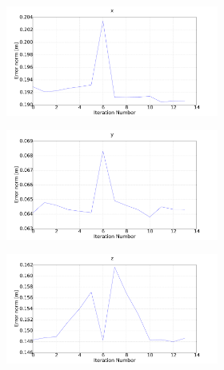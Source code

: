 \begin{figure}
  \centering
  \begin{subfigure}{0.48\textwidth}
    \begin{subfigure}{\textwidth}
      \includegraphics[clip, trim = 60 0 140 20, width=\textwidth]{figures/chapter3/err_x}
    \end{subfigure}
    \begin{subfigure}{\textwidth}
      \includegraphics[clip, trim = 60 0 140 0, width=\textwidth]{figures/chapter3/err_y}
    \end{subfigure}
    \begin{subfigure}{\textwidth}
      \includegraphics[clip, trim = 60 0 140 0, width=\textwidth]{figures/chapter3/err_z}

\end{subfigure}
\end{subfigure}
\end{figure}
